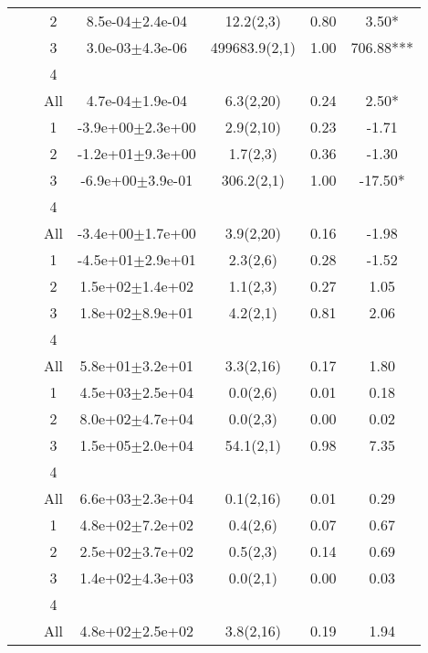 \begin{longtable}{llccccS[table-format=-2.2, table-space-text-post = {***}]}
   &  & 2 &  8.5e-04$\pm$2.4e-04 & 12.2(2,3) & 0.80 & 3.50* \\ 
   &  & 3 &  3.0e-03$\pm$4.3e-06 & 499683.9(2,1) & 1.00 & 706.88*** \\ 
   &  & 4 &  &  &  &  \\ 
   &  & All &  4.7e-04$\pm$1.9e-04 & 6.3(2,20) & 0.24 & 2.50* \\ 
   \midrule
{} & {} & 1 & -3.9e+00$\pm$2.3e+00 & 2.9(2,10) & 0.23 & -1.71 \\ 
   &  & 2 & -1.2e+01$\pm$9.3e+00 & 1.7(2,3) & 0.36 & -1.30 \\ 
   &  & 3 & -6.9e+00$\pm$3.9e-01 & 306.2(2,1) & 1.00 & -17.50* \\ 
   &  & 4 &  &  &  &  \\ 
   &  & All & -3.4e+00$\pm$1.7e+00 & 3.9(2,20) & 0.16 & -1.98 \\ 
   \midrule
{} & {} & 1 & -4.5e+01$\pm$2.9e+01 & 2.3(2,6) & 0.28 & -1.52 \\ 
   &  & 2 &  1.5e+02$\pm$1.4e+02 & 1.1(2,3) & 0.27 & 1.05 \\ 
   &  & 3 &  1.8e+02$\pm$8.9e+01 & 4.2(2,1) & 0.81 & 2.06 \\ 
   &  & 4 &  &  &  &  \\ 
   &  & All &  5.8e+01$\pm$3.2e+01 & 3.3(2,16) & 0.17 & 1.80 \\ 
   \midrule
{} & {} & 1 &  4.5e+03$\pm$2.5e+04 & 0.0(2,6) & 0.01 & 0.18 \\ 
   &  & 2 &  8.0e+02$\pm$4.7e+04 & 0.0(2,3) & 0.00 & 0.02 \\ 
   &  & 3 &  1.5e+05$\pm$2.0e+04 & 54.1(2,1) & 0.98 & 7.35 \\ 
   &  & 4 &  &  &  &  \\ 
   &  & All &  6.6e+03$\pm$2.3e+04 & 0.1(2,16) & 0.01 & 0.29 \\ 
   \midrule
{} & {} & 1 &  4.8e+02$\pm$7.2e+02 & 0.4(2,6) & 0.07 & 0.67 \\ 
   &  & 2 &  2.5e+02$\pm$3.7e+02 & 0.5(2,3) & 0.14 & 0.69 \\ 
   &  & 3 &  1.4e+02$\pm$4.3e+03 & 0.0(2,1) & 0.00 & 0.03 \\ 
   &  & 4 &  &  &  &  \\ 
   &  & All &  4.8e+02$\pm$2.5e+02 & 3.8(2,16) & 0.19 & 1.94 \\ 
   \midrule

\end{longtable}
